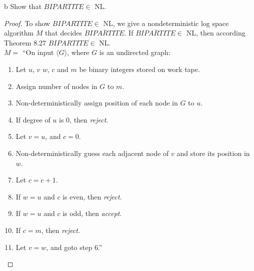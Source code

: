 \documentclass[11pt]{article}
\begin{document}
\newpage

\begin{problem}[Part]{b}
Show that $BIPARTITE \in $ NL.
\end{problem}

\begin{proof}
To show $BIPARTITE \in$ NL, we give a nondeterministic log space algorithm $M$ that decides $\overline{BIPARTITE}$. If $\overline{BIPARTITE} \in$ NL, then according Theorem 8.27 $BIPARTITE \in$ NL. \\

$M =$ \textquotedblleft On input $\langle G \rangle$, where $G$ is an undirected graph:
\begin{enumerate}
\item Let $u$, $v$ $w$, $c$ and $m$ be binary integers stored on work tape.
\item Assign number of nodes in $G$ to $m$.
\item Non-deterministically assign position of each node in $G$ to $u$.
\item If degree of $u$ is 0, then \textit{reject}.
\item Let $v = u$, and $c = 0$.
\item Non-deterministically guess each adjacent node of $v$ and store its position in $w$.
\item Let $c = c + 1$.
\item If $w = u$ and $c$ is even, then \textit{reject}.
\item If $w = u$ and $c$ is odd, then \textit{accept}.
\item If $c = m$, then \textit{reject}.
\item Let $v = w$, and goto step 6.\textquotedblright
\end{enumerate}
\end{proof}
\end{document}
